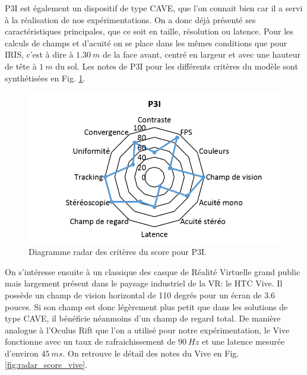 \par P3I est également un dispositif de type CAVE, que l'on connait bien car il a servi à la réalisation de nos expérimentations. On a donc déjà présenté ses caractéristiques principales, que ce soit en taille, résolution ou latence. Pour les calculs de champs et d'acuité on se place dans les mêmes conditions que pour IRIS, c'est à dire à $1.30~m$ de la face avant, centré en largeur et avec une hauteur de tête à $1~m$ du sol. Les notes de P3I pour les différents critères du modèle sont synthétisées en Fig. \ref{fig:radar_score_p3i}.

\begin{figure}
	\centering
	\includegraphics[scale=1]{Figures/RadarScoreP3I}
	\caption{Diagramme radar des critères du score pour P3I.}
	\label{fig:radar_score_p3i}
\end{figure}

\par On s'intéresse ensuite à un classique des casque de Réalité Virtuelle grand public mais largement présent dans le paysage industriel de la VR: le HTC Vive. Il possède un champ de vision horizontal de 110 degrés pour un écran de 3.6 pouces. Si son champ est donc légèrement plus petit que dans les solutions de type CAVE, il bénéficie néanmoins d'un champ de regard total. De manière analogue à l'Oculus Rift que l'on a utilisé pour notre expérimentation, le Vive fonctionne avec un taux de rafraichissement de $90~Hz$ et une latence mesurée d'environ $45~ms$. On retrouve le détail des notes du Vive en Fig. \ref{fig:radar_score_vive}.

